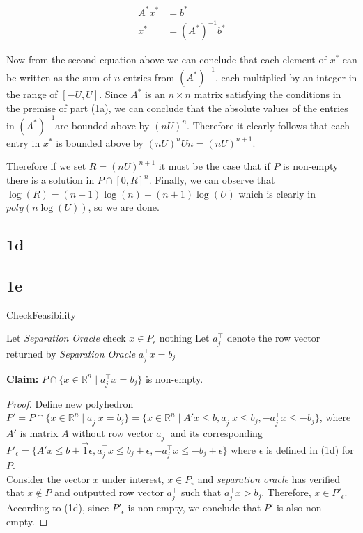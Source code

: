 \documentclass{article}
\newcommand{\astarinv}{$(A^*)^{-1}$}
\begin{document}
\begin{align}
  A^* x^* &= b^* \\
  x^* &= (A^*)^{-1} b^* 
\end{align}

Now from the second equation above we can conclude that each element
of $x^*$ can be written as the sum of $n$ entries from \astarinv,
each multiplied by an integer in the range of $[-U, U]$. Since $A^*$
is an $n \times n$ matrix satisfying the conditions in the premise
of part (1a), we can conclude that the absolute values of the
entries in \astarinv are bounded above by $(nU)^n$. Therefore it
clearly follows that each entry in $x^*$ is bounded above by
$(nU)^n U n = (nU)^{n + 1}$.

Therefore if we set
$R = (nU)^{n + 1}$ it must be the case that if $P$ is
non-empty there is a solution in $P \cap [0, R]^n$.
Finally, we can observe that $\log(R) = (n + 1)\log(n) + (n + 1)\log(U)$
which is clearly in $poly(n\log(U))$, so we are done.


\subsection*{1d}
\subsection*{1e}\begin{algorithm}[H]
\caption{{\sc CheckFeasibility}}
\begin{algorithmic}[1]
\State Let {\em Separation Oracle} check $x\in P_{\epsilon}$
\Return nothing
\Else
\State Let $a_j^{\intercal}$ denote the row vector returned by {\em Separation Oracle}
\State \Return $a_j^{\intercal}x = b_j$
\EndIf
\end{algorithmic}
\end{algorithm}
\textbf{Claim:} $P\cap \{x\in\mathbb{R}^n\mid a_j^{\intercal}x = b_j\}$ is non-empty.
\begin{proof}
  Define new polyhedron $P' = P\cap \{x\in\mathbb{R}^n\mid a_j^{\intercal}x = b_j\} =
  \{x\in\mathbb{R}^n\mid A'x \leq b, a_j^{\intercal}x \leq b_j, -a_j^{\intercal}x \leq -b_j \}$,
  where $A'$ is matrix $A$ without row vector $a_j^{\intercal}$ and its corresponding $P'_{\epsilon} = \{A'x\leq b + \vec{1}\epsilon, a_j^{\intercal}x \leq b_j + \epsilon, -a_j^{\intercal}x \leq -b_j + \epsilon\}$ where $\epsilon$ is defined in (1d) for $P$. \\
  Consider the vector $x$ under interest, $x\in P_{\epsilon}$ and {\em separation oracle}
  has verified that $x\notin P$ and outputted row vector $a_j^{\intercal}$ such that $a_j^{\intercal}x > b_j$. Therefore, $x\in P'_{\epsilon}$. According to (1d), since $P'_{\epsilon}$ is non-empty, we conclude that $P'$ is also non-empty. 
\end{proof}
\end{document}
